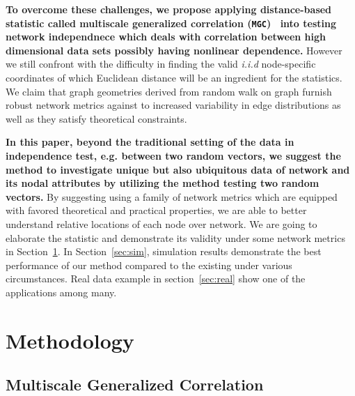 \documentclass[12pt]{article}
\theoremstyle{definition}
\begin{document}
\textbf{To overcome these challenges, we propose applying distance-based statistic called multiscale generalized correlation (\texttt{MGC})~\citep{shen2016discovering} into testing network independnece which deals with correlation between high dimensional data sets possibly having nonlinear dependence.} However we still confront with the difficulty in finding the valid \textit{i.i.d} node-specific coordinates of which Euclidean distance will be an ingredient for the statistics. We claim that graph geometries derived from random walk on graph furnish robust network metrics against to increased variability in edge distributions as well as they satisfy theoretical constraints.
	
\textbf{In this paper, beyond the traditional setting of the data in independence test, e.g. between two random vectors, we suggest the method to investigate unique but also ubiquitous data of network and its nodal attributes by utilizing the method testing two random vectors.} By suggesting using a family of network metrics which are equipped with favored theoretical and practical properties, we are able to better understand relative locations of each node over network. We are going to elaborate the statistic and demonstrate its validity under some network metrics in Section~\ref{sec:method}. In Section~\ref{sec:sim}, simulation results demonstrate the best performance of our method compared to the existing under various circumstances. Real data example in section~\ref{sec:real} show one of the applications among many.  
	
\bigskip
\section{Methodology}
\label{sec:method}

\subsection{Multiscale Generalized Correlation}
\end{document}
